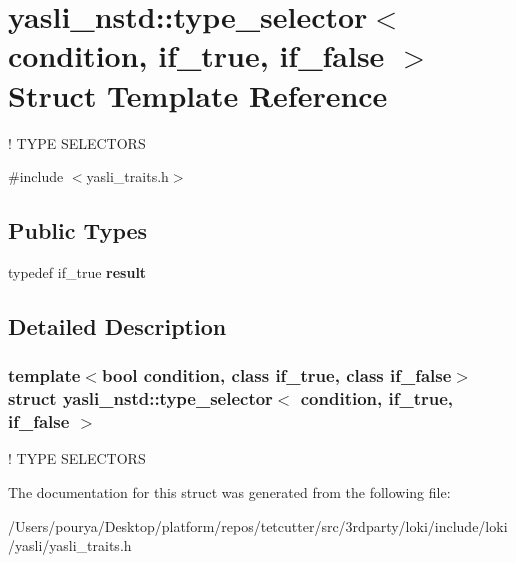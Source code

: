\hypertarget{structyasli__nstd_1_1type__selector}{}\section{yasli\+\_\+nstd\+:\+:type\+\_\+selector$<$ condition, if\+\_\+true, if\+\_\+false $>$ Struct Template Reference}
\label{structyasli__nstd_1_1type__selector}


! T\+Y\+P\+E S\+E\+L\+E\+C\+T\+O\+R\+S  




{\ttfamily \#include $<$yasli\+\_\+traits.\+h$>$}

\subsection*{Public Types}
\begin{DoxyCompactItemize}
\item 
\hypertarget{structyasli__nstd_1_1type__selector_af0f953b3a9ce641ade9665096d997b28}{}typedef if\+\_\+true {\bfseries result}\label{structyasli__nstd_1_1type__selector_af0f953b3a9ce641ade9665096d997b28}

\end{DoxyCompactItemize}


\subsection{Detailed Description}
\subsubsection*{template$<$bool condition, class if\+\_\+true, class if\+\_\+false$>$struct yasli\+\_\+nstd\+::type\+\_\+selector$<$ condition, if\+\_\+true, if\+\_\+false $>$}

! T\+Y\+P\+E S\+E\+L\+E\+C\+T\+O\+R\+S 

The documentation for this struct was generated from the following file\+:\begin{DoxyCompactItemize}
\item 
/\+Users/pourya/\+Desktop/platform/repos/tetcutter/src/3rdparty/loki/include/loki/yasli/yasli\+\_\+traits.\+h\end{DoxyCompactItemize}
